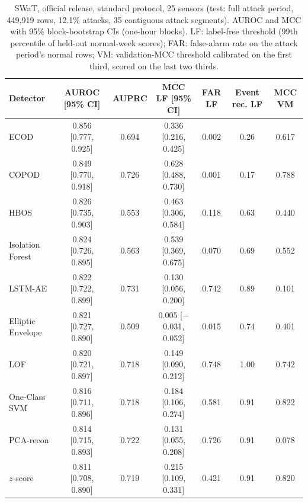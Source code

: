 \documentclass[11pt]{article}
\begin{document}
\begin{table}[t]
\centering\small
\caption{SWaT, official release, standard protocol, 25 sensors (test: full attack
period, 449{,}919 rows, 12.1\% attacks, 35 contiguous attack segments). AUROC and MCC
with 95\% block-bootstrap CIs (one-hour blocks). LF: label-free threshold (99th
percentile of held-out normal-week scores); FAR: false-alarm rate on the attack
period's normal rows; VM: validation-MCC threshold calibrated on the first third,
scored on the last two thirds.}
\label{tab:swat}
\begin{tabular}{lcccccc}
\toprule
Detector & AUROC [95\% CI] & AUPRC & MCC LF [95\% CI] & FAR LF & Event rec. LF & MCC VM \\
\midrule
ECOD & 0.856 [0.777, 0.925] & 0.694 & 0.336 [0.216, 0.425] & 0.002 & 0.26 & 0.617 \\
COPOD & 0.849 [0.770, 0.918] & 0.726 & 0.628 [0.488, 0.730] & 0.001 & 0.17 & 0.788 \\
HBOS & 0.826 [0.735, 0.903] & 0.553 & 0.463 [0.306, 0.584] & 0.118 & 0.63 & 0.440 \\
Isolation Forest & 0.824 [0.726, 0.895] & 0.563 & 0.539 [0.369, 0.675] & 0.070 & 0.69 & 0.552 \\
LSTM-AE & 0.822 [0.722, 0.899] & 0.731 & 0.130 [0.056, 0.200] & 0.742 & 0.89 & 0.101 \\
Elliptic Envelope & 0.821 [0.727, 0.890] & 0.509 & 0.005 [$-$0.031, 0.052] & 0.015 & 0.74 & 0.401 \\
LOF & 0.820 [0.721, 0.897] & 0.718 & 0.149 [0.090, 0.212] & 0.748 & 1.00 & 0.742 \\
One-Class SVM & 0.816 [0.711, 0.896] & 0.718 & 0.184 [0.106, 0.274] & 0.581 & 0.91 & 0.822 \\
PCA-recon & 0.814 [0.715, 0.893] & 0.722 & 0.131 [0.055, 0.208] & 0.726 & 0.91 & 0.078 \\
$z$-score & 0.811 [0.708, 0.890] & 0.719 & 0.215 [0.109, 0.331] & 0.421 & 0.91 & 0.820 \\
\bottomrule
\end{tabular}
\end{table}
\end{document}
